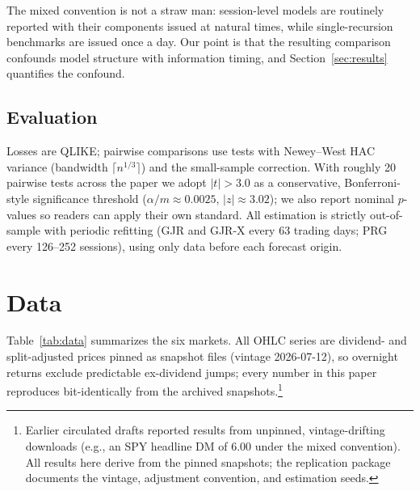 \documentclass[11pt,a4paper]{article}
\begin{document}
The mixed convention is not a straw man: session-level models are routinely reported with their components issued at natural times, while single-recursion benchmarks are issued once a day. Our point is that the resulting comparison confounds model structure with information timing, and Section~\ref{sec:results} quantifies the confound.

\subsection{Evaluation}
\label{sec:eval}

Losses are QLIKE; pairwise comparisons use \citet{Diebold1995} tests with Newey--West HAC variance (bandwidth $\lceil n^{1/3}\rceil$) and the \citet{Harvey1997} small-sample correction. With roughly 20 pairwise tests across the paper we adopt $|t|>3.0$ as a conservative, Bonferroni-style significance threshold ($\alpha/m \approx 0.0025$, $|z|\approx 3.02$); we also report nominal $p$-values so readers can apply their own standard. All estimation is strictly out-of-sample with periodic refitting (GJR and GJR-X every 63 trading days; PRG every 126--252 sessions), using only data before each forecast origin.

\section{Data}

Table~\ref{tab:data} summarizes the six markets. All OHLC series are dividend- and split-adjusted prices pinned as snapshot files (vintage 2026-07-12), so overnight returns exclude predictable ex-dividend jumps; every number in this paper reproduces bit-identically from the archived snapshots.\footnote{Earlier circulated drafts reported results from unpinned, vintage-drifting downloads (e.g., an SPY headline DM of 6.00 under the mixed convention). All results here derive from the pinned snapshots; the replication package documents the vintage, adjustment convention, and estimation seeds.}
\end{document}
